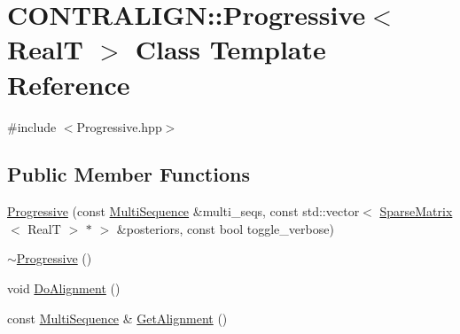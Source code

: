 \hypertarget{class_c_o_n_t_r_a_l_i_g_n_1_1_progressive}{\section{C\+O\+N\+T\+R\+A\+L\+I\+G\+N\+:\+:Progressive$<$ Real\+T $>$ Class Template Reference}
\label{class_c_o_n_t_r_a_l_i_g_n_1_1_progressive}
}


{\ttfamily \#include $<$Progressive.\+hpp$>$}

\subsection*{Public Member Functions}
\begin{DoxyCompactItemize}
\item 
\hyperlink{class_c_o_n_t_r_a_l_i_g_n_1_1_progressive_ab7475b795a4e8f7c23b64bd69ad1fca4}{Progressive} (const \hyperlink{class_c_o_n_t_r_a_l_i_g_n_1_1_multi_sequence}{Multi\+Sequence} \&multi\+\_\+seqs, const std\+::vector$<$ \hyperlink{class_c_o_n_t_r_a_l_i_g_n_1_1_sparse_matrix}{Sparse\+Matrix}$<$ Real\+T $>$ $\ast$ $>$ \&posteriors, const bool toggle\+\_\+verbose)
\item 
\hyperlink{class_c_o_n_t_r_a_l_i_g_n_1_1_progressive_ac8444df099c393dfc38f80e0c21ca16b}{$\sim$\+Progressive} ()
\item 
void \hyperlink{class_c_o_n_t_r_a_l_i_g_n_1_1_progressive_a069b4945d754c644842fbc0df8a78fb6}{Do\+Alignment} ()
\item 
const \hyperlink{class_c_o_n_t_r_a_l_i_g_n_1_1_multi_sequence}{Multi\+Sequence} \& \hyperlink{class_c_o_n_t_r_a_l_i_g_n_1_1_progressive_ab0e037b634cc5dd116b94135495b5712}{Get\+Alignment} ()
\end{DoxyCompactItemize}


